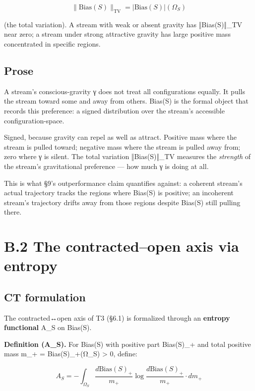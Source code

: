 \documentclass[11pt, openany]{book}
\newcommand{\sectionbreak}{\clearpage}
\begin{document}
$$\|\text{Bias}(S)\|_{\text{TV}} = |\text{Bias}(S)|(\Omega_S)$$

(the total variation). A stream with weak or absent gravity has ‖Bias(S)‖\_\allowbreak{}TV near zero; a stream under strong attractive gravity has large positive mass concentrated in specific regions.

\subsection{Prose}

A stream's conscious-gravity γ does not treat all configurations equally. It pulls the stream toward some and away from others. Bias(S) is the formal object that records this preference: a signed distribution over the stream's accessible configuration-space.

Signed, because gravity can repel as well as attract. Positive mass where the stream is pulled toward; negative mass where the stream is pulled away from; zero where γ is silent. The total variation ‖Bias(S)‖\_\allowbreak{}TV measures the \textit{strength} of the stream's gravitational preference --- how much γ is doing at all.

This is what §9's outperformance claim quantifies against: a coherent stream's actual trajectory tracks the regions where Bias(S) is positive; an incoherent stream's trajectory drifts away from those regions despite Bias(S) still pulling there.

\sectionbreak

\section{B.2 The contracted–open axis via entropy}

\subsection{CT formulation}

The contracted↔open axis of T3 (§6.1) is formalized through an \textbf{entropy functional} A\_\allowbreak{}S on Bias(S).

\textbf{Definition (A\_\allowbreak{}S).} For Bias(S) with positive part Bias(S)\_\allowbreak{}+ and total positive mass m\_\allowbreak{}+ = Bias(S)\_\allowbreak{}+(Ω\_\allowbreak{}S) > 0, define:

$$A_S = -\int_{\Omega_S} \frac{d\text{Bias}(S)_+}{m_+} \log \frac{d\text{Bias}(S)_+}{m_+} \cdot dm_+$$
\end{document}
